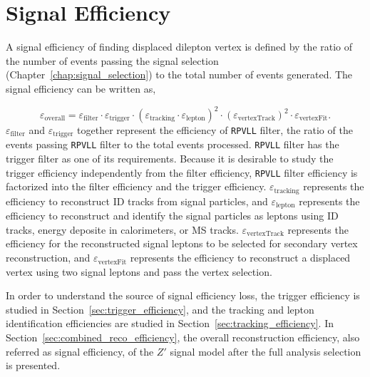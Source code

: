 \chapter{Signal Efficiency}
\label{chap:eff}

A signal efficiency of finding displaced dilepton vertex is defined by the ratio of the number of events passing the signal selection (Chapter~\ref{chap:signal_selection}) to the total number of events generated. The signal efficiency can be written as,

\begin{equation}
\label{eq:OverallEff}
\varepsilon_{\mathrm{overall}} = \varepsilon_{\mathrm{filter}} \cdot \varepsilon_{\mathrm{trigger}} \cdot 
                     (\varepsilon_{\mathrm{tracking}} \cdot \varepsilon_{\mathrm{lepton}})^2 \cdot
                     (\varepsilon_{\mathrm{vertexTrack}})^2 \cdot
                     \varepsilon_{\mathrm{vertexFit}}.
\end{equation}
%
$\varepsilon_{\mathrm{filter}}$ and $\varepsilon_{\mathrm{trigger}}$ together represent the efficiency of \texttt{RPVLL} filter, the ratio of the events passing \texttt{RPVLL} filter to the total events processed. \texttt{RPVLL} filter has the trigger filter as one of its requirements. Because it is desirable to study the trigger efficiency independently from the filter efficiency, \texttt{RPVLL} filter efficiency is factorized into the filter efficiency and the trigger efficiency. $\varepsilon_{\mathrm{tracking}}$ represents the efficiency to reconstruct ID tracks from signal particles, and $\varepsilon_{\mathrm{lepton}}$ represents the efficiency to reconstruct and identify the signal particles as leptons using ID tracks, energy deposite in calorimeters, or MS tracks. $\varepsilon_{\mathrm{vertexTrack}}$ represents the efficiency for the reconstructed signal leptons to be selected for secondary vertex reconstruction, and $\varepsilon_{\mathrm{vertexFit}}$ represents the efficiency to reconstruct a displaced vertex using two signal leptons and pass the vertex selection.

In order to understand the source of signal efficiency loss, the trigger efficiency is studied in Section~\ref{sec:trigger_efficiency}, and the tracking and lepton identification efficiencies are studied in Section~\ref{sec:tracking_efficiency}. In Section~\ref{sec:combined_reco_efficiency}, the overall reconstruction efficiency, also referred as signal efficiency, of the $Z'$ signal model after the full analysis selection is presented. 

